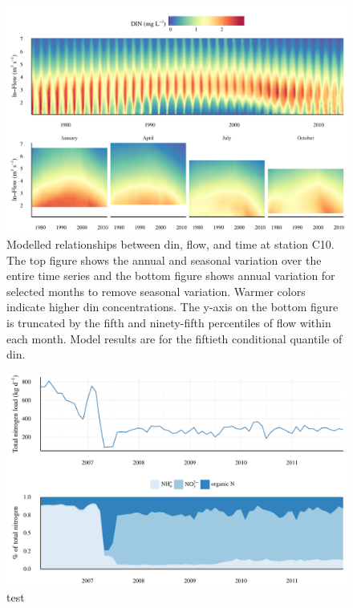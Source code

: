 \documentclass[letterpaper,12pt,oneside]{article}\usepackage[]{graphicx}\usepackage[]{color}
\begin{document}
\begin{figure}[!ht]

{\centering \includegraphics[width=\textwidth]{figs/dinc10dyna-1} 

}

\caption{Modelled relationships between \ac{din}, flow, and time at station C10.  The top figure shows the annual and seasonal variation over the entire time series and the bottom figure shows annual variation for selected months to remove seasonal variation.  Warmer colors indicate higher \ac{din} concentrations.  The y-axis on the bottom figure is truncated by the fifth and ninety-fifth percentiles of flow within each month.  Model results are for the fiftieth conditional quantile of \ac{din}.}\label{fig:dinc10dyna}
\end{figure}



\begin{figure}[!ht]

{\centering \includegraphics[width=\textwidth]{figs/tracy-1} 

}

\caption[test]{test}\label{fig:tracy}
\end{figure}
\end{document}
